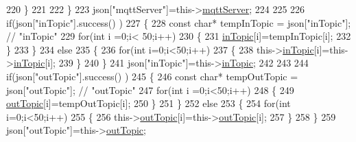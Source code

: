 \begin{DoxyCode}
220                     \}
221 
222                 \}
223                 json[\textcolor{stringliteral}{"mqttServer"}]=this->\hyperlink{classCoolMQTT_ab8bb951f87ddbf92db74c2ad16a3e53e}{mqttServer};
224 
225                 
226                 \textcolor{keywordflow}{if}(json[\textcolor{stringliteral}{"inTopic"}].success() )
227                 \{
228                     \textcolor{keyword}{const} \textcolor{keywordtype}{char}* tempInTopic = json[\textcolor{stringliteral}{"inTopic"}]; \textcolor{comment}{// "inTopic"}
229                     \textcolor{keywordflow}{for}(\textcolor{keywordtype}{int} i =0;i< 50;i++)
230                     \{
231                         \hyperlink{classCoolMQTT_a4492f52a441e83cc5151010317fdb52d}{inTopic}[i]=tempInTopic[i];
232                     \}
233                 \}
234                 \textcolor{keywordflow}{else}
235                 \{
236                     \textcolor{keywordflow}{for}(\textcolor{keywordtype}{int} i=0;i<50;i++)
237                     \{
238                         this->\hyperlink{classCoolMQTT_a4492f52a441e83cc5151010317fdb52d}{inTopic}[i]=this->\hyperlink{classCoolMQTT_a4492f52a441e83cc5151010317fdb52d}{inTopic}[i];
239                     \}               
240                 \}
241                 json[\textcolor{stringliteral}{"inTopic"}]=this->\hyperlink{classCoolMQTT_a4492f52a441e83cc5151010317fdb52d}{inTopic};
242                 
243                 
244                 \textcolor{keywordflow}{if}(json[\textcolor{stringliteral}{"outTopic"}].success() )
245                 \{
246                     \textcolor{keyword}{const} \textcolor{keywordtype}{char}* tempOutTopic = json[\textcolor{stringliteral}{"outTopic"}]; \textcolor{comment}{// "outTopic"}
247                     \textcolor{keywordflow}{for}(\textcolor{keywordtype}{int} i =0;i<50;i++)
248                     \{
249                         \hyperlink{classCoolMQTT_a109c786a17b463f9eeba046194279522}{outTopic}[i]=tempOutTopic[i];
250                     \}
251                 \}
252                 \textcolor{keywordflow}{else}
253                 \{
254                     \textcolor{keywordflow}{for}(\textcolor{keywordtype}{int} i=0;i<50;i++)
255                     \{
256                         this->\hyperlink{classCoolMQTT_a109c786a17b463f9eeba046194279522}{outTopic}[i]=this->\hyperlink{classCoolMQTT_a109c786a17b463f9eeba046194279522}{outTopic}[i];
257                     \}
258                 \}
259                 json[\textcolor{stringliteral}{"outTopic"}]=this->\hyperlink{classCoolMQTT_a109c786a17b463f9eeba046194279522}{outTopic};

\end{DoxyCode}

